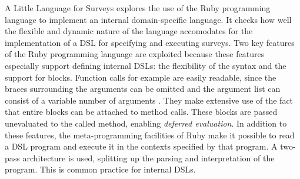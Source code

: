 A Little Language for Surveys \cite{RubyDSL} explores the use of the Ruby programming language to implement an internal domain-specific language. It checks how well the flexible and dynamic nature of the language accomodates for the implementation of a DSL for specifying and executing surveys. Two key features of the Ruby programming language are exploited because these features especially support defining internal DSLs: the flexibility of the syntax and the support for blocks. Function calls for example are easily readable, since the braces surrounding the arguments can be omitted and the argument list can consist of a variable number of arguments . They make extensive use of the fact that entire blocks can be attached to method calls. These blocks are passed unevaluated to the called method, enabling \textit{deferred evaluation}. In addition to these features, the meta-programming facilities of Ruby make it possible to read a DSL program and execute it in the contexts specified by that program. A two-pass architecture is used, splitting up the parsing and interpretation of the program. This is common practice for internal DSLs.
